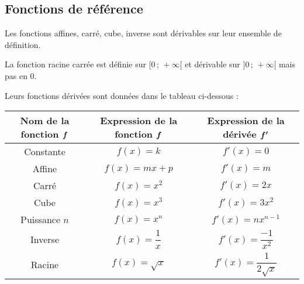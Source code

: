 \documentclass[a4paper,11pt]{article}
\begin{document}
\subsection{Fonctions de référence}

\begin{cthm}
Les fonctions affines, carré, cube, inverse sont dérivables sur leur ensemble de définition.

La fonction racine carrée est définie sur $[0\,;\,+\infty[$ et dérivable sur $]0\,;\,+\infty[$ mais pas en 0.

Leurs fonctions dérivées sont données dans le tableau ci-dessous : 

\begin{center}
	\renewcommand{\arraystretch}{2}
	\begin{tabular}{|c|c|c|}
		\hline
		\textbf{Nom de la fonction} $\bm{f}$ & \textbf{Expression de la fonction} $\bm{f}$ & \textbf{Expression de la dérivée} $\bm{f'}$ \\
		\hline
		Constante &$ f(x)=k$&$f'(x)=0$\\ \hline
		Affine&$f(x)=mx+p$&$f'(x)=m$\\ \hline
		Carré &$f(x)=x^2$ & $f'(x)=2x$ \\ \hline
		Cube &$f(x)=x^3$ & $f'(x)=3x^2$ \\ \hline
		Puissance $n$ &$f(x)=x^n$ & $f'(x)=nx^{n-1}$ \\ \hline
		Inverse & $f(x)=\dfrac{1}{x}$&$f'(x)=\dfrac{-1}{x^2}$\\ \hline
		Racine &$f(x)=\sqrt{x}$ & $f'(x)=\dfrac{1}{2\sqrt{x}}$\\
		
		\hline
	\end{tabular}
\end{center}
\end{cthm}
\end{document}
